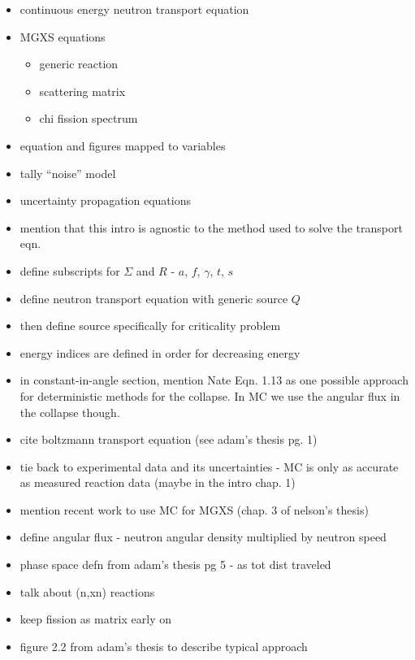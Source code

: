 \begin{itemize}[noitemsep]
  \item continuous energy neutron transport equation
  \item \ac{MGXS} equations
  \begin{itemize}[noitemsep]
    \item generic reaction
    \item scattering matrix
    \item chi fission spectrum
  \end{itemize}
  \item equation and figures mapped to variables
  \item tally ``noise'' model
  \item uncertainty propagation equations
  \item mention that this intro is agnostic to the method used to solve the transport eqn.
   \item define subscripts for $\Sigma$ and $R$ - $a$, $f$, $\gamma$, $t$, $s$
   \item define neutron transport equation with generic source $Q$
   \item then define source specifically for criticality problem
   \item energy indices are defined in order for decreasing energy
   \item in constant-in-angle section, mention Nate Eqn. 1.13 as one possible approach for deterministic methods for the collapse. In MC we use the angular flux in the collapse though.
   \item cite boltzmann transport equation (see adam's thesis pg. 1) 
   \item tie back to experimental data and its uncertainties - MC is only as accurate as measured reaction data (maybe in the intro chap. 1)
   \item mention recent work to use MC for MGXS (chap. 3 of nelson's thesis)
   \item define angular flux - neutron angular density multiplied by neutron speed
   \item phase space defn from adam's thesis pg 5 - as tot dist traveled
   \item talk about (n,xn) reactions
   \item keep fission as matrix early on
   \item figure 2.2 from adam's thesis to describe typical approach
\end{itemize}


